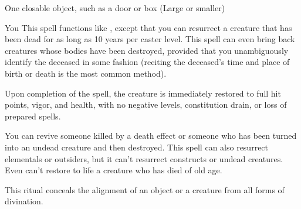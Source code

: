 \begin{spelltarget}{One closable object, such as a door or box (Large or smaller)}
\begin{spelltarget}{You}
\spelleffect This spell functions like , except that you can resurrect a creature that has been dead for as long as 10 years per caster level. This spell can even bring back creatures whose bodies have been destroyed, provided that you unambiguously identify the deceased in some fashion (reciting the deceased's time and place of birth or death is the most common method).
\par Upon completion of the spell, the creature is immediately restored to full hit points, vigor, and health, with no negative levels, constitution drain, or loss of prepared spells.
\par You can revive someone killed by a death effect or someone who has been turned into an undead creature and then destroyed. This spell can also resurrect elementals or outsiders, but it can't resurrect constructs or undead creatures.
\spellnotes Even  can't restore to life a creature who has died of old age.

\spelldur{\durext \dismissable}
\spelleffect This ritual conceals the alignment of an object or a creature from all forms of divination.


\end{spelltarget}
\end{spelltarget}
